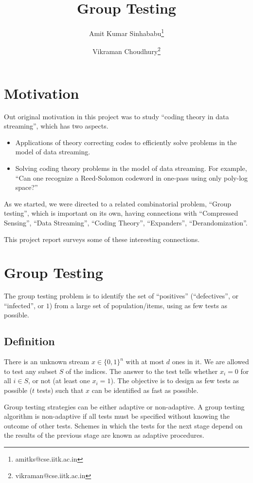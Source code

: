 \documentclass{article}
\title{\textbf{Group Testing}}
\author{Amit Kumar Sinhababu\thanks{amitks@cse.iitk.ac.in} }
\author{Vikraman Choudhury\thanks{vikraman@cse.iitk.ac.in} }
\affil{Department of Computer Science and Engineering,\\
  Indian Institute of Technology Kanpur
}
\begin{document}
\maketitle

\section{Motivation}
Out original motivation in this project was to study ``coding theory in data streaming'',
which has two aspects.

\begin{itemize}
\item Applications of theory correcting codes to efficiently solve problems in the model of data streaming.
\item Solving coding theory problems in the model of data streaming. For example,
  ``Can one recognize a Reed-Solomon codeword in one-pass using only poly-log space?''\cite{sublinear}
\end{itemize}

As we started, we were directed to a related combinatorial problem, ``Group testing'',
which is important on its own, having connections with ``Compressed Sensing'', ``Data Streaming'',
``Coding Theory'', ``Expanders'', ``Derandomization''.

This project report surveys some of these interesting connections.

\section{Group Testing}

The group testing problem is to identify the set of ``positives'' (``defectives'', or
``infected'', or $1$) from a large set of population/items, using as few tests as possible.

\subsection{Definition}
There is an unknown stream $x \in \{0,1\}^n$ with at most $d$ ones in it. We are allowed to test
any subset $S$ of the indices. The answer to the test tells whether $x_i = 0$ for all $i \in S$,
or not (at least one $x_i = 1$). The objective is to design as few tests as possible ($t$ tests)
such that $x$ can be identified as fast as possible.

Group testing strategies can be either adaptive or non-adaptive. A group testing algorithm is
non-adaptive if all tests must be specified without knowing the outcome of other tests. Schemes
in which the tests for the next stage depend on the results of the previous stage are known as
adaptive procedures.
\end{document}
